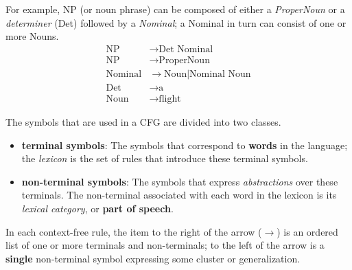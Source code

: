 \documentclass[11pt]{article}
\begin{document}
For example, NP (or noun phrase) can be composed of either a \emph{ProperNoun} or a \emph{determiner} (Det) followed by a \emph{Nominal}; a Nominal in turn can consist of one or more Nouns.
\begin{align*}
\text{NP} &\rightarrow \text{Det Nominal} \\
\text{NP} &\rightarrow \text{ProperNoun} \\
\text{Nominal} &\rightarrow \text{Noun} | \text{Nominal Noun} \\
\text{Det} & \rightarrow \text{a} \\
\text{Noun} &\rightarrow \text{flight}
\end{align*} 


The symbols that are used in a CFG are divided into two classes. 
\begin{itemize}
\item \textbf{terminal symbols}: The symbols  that correspond to \textbf{words} in the language; the \emph{lexicon} is the set of rules that introduce these terminal symbols. 
\item \textbf{non-terminal symbols}: The symbols that express \emph{abstractions} over these terminals. The non-terminal associated with each word in the lexicon is its \emph{lexical category}, or \textbf{part of speech}.
\end{itemize}
In each context-free rule, the item to the right of the arrow ($\rightarrow$) is an ordered list of one or more terminals and non-terminals; to the left of the arrow is a \textbf{single} non-terminal symbol expressing some cluster or generalization. 

\end{document}
